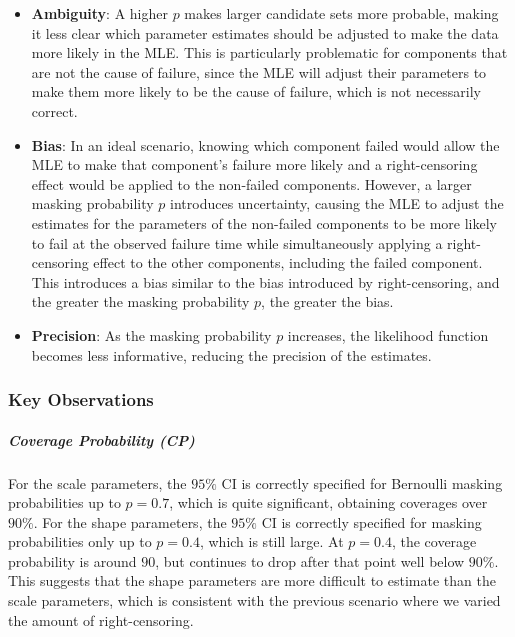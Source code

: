 \documentclass[
]{article}
\theoremstyle{definition}
\theoremstyle{plain}
\theoremstyle{definition}
\theoremstyle{definition}
\theoremstyle{definition}
\theoremstyle{definition}
\theoremstyle{remark}
\begin{document}
\begin{itemize}
\item
  \textbf{Ambiguity}: A higher \(p\) makes larger candidate sets more probable, making
  it less clear which parameter estimates should be adjusted to make the data
  more likely in the MLE. This is particularly problematic for components that are
  not the cause of failure, since the MLE will adjust their parameters to make
  them more likely to be the cause of failure, which is not necessarily correct.
\item
  \textbf{Bias}: In an ideal scenario, knowing which component failed would allow
  the MLE to make that component's failure more likely and a right-censoring
  effect would be applied to the non-failed components. However, a larger masking
  probability \(p\) introduces uncertainty, causing the MLE to adjust the estimates
  for the parameters of the non-failed components to be more likely to fail at the
  observed failure time while simultaneously applying a right-censoring effect to
  the other components, including the failed component. This introduces a bias
  similar to the bias introduced by right-censoring, and the greater the masking
  probability \(p\), the greater the bias.
\item
  \textbf{Precision}: As the masking probability \(p\) increases, the likelihood
  function becomes less informative, reducing the precision of the estimates.
\end{itemize}

\hypertarget{key-observations-1}{%
\subsubsection{Key Observations}\label{key-observations-1}}

\hypertarget{coverage-probability-cp-1}{%
\subparagraph*{Coverage Probability (CP)}\label{coverage-probability-cp-1}}

For the scale parameters, the \(95\%\) CI is correctly specified for Bernoulli
masking probabilities up to \(p = 0.7\), which is quite significant,
obtaining coverages over \(90\%\). For the shape parameters, the \(95\%\) CI is
correctly specified for masking probabilities only up to \(p = 0.4\), which is still
large. At \(p = 0.4\), the coverage probability is around \(90%
\), but continues to
drop after that point well below \(90\%\). This suggests that the shape parameters
are more difficult to estimate than the scale parameters, which is consistent
with the previous scenario where we varied the amount of right-censoring.
\end{document}

